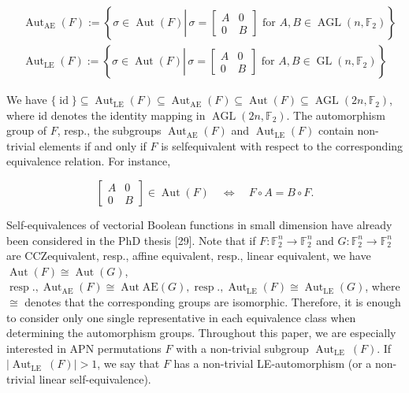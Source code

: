 \documentclass[10pt]{article}
\begin{document}
$$
\begin{aligned}
& \operatorname{Aut}_{\mathrm{AE}}(F):=\left\{\sigma \in \operatorname{Aut}(F) \left\lvert\, \sigma=\left[\begin{array}{cc}
A & 0 \\
0 & B
\end{array}\right]\right. \text { for } A, B \in \operatorname{AGL}\left(n, \mathbb{F}_{2}\right)\right\} \\
& \operatorname{Aut}_{\mathrm{LE}}(F):=\left\{\sigma \in \operatorname{Aut}(F) \left\lvert\, \sigma=\left[\begin{array}{cc}
A & 0 \\
0 & B
\end{array}\right]\right. \text { for } A, B \in \operatorname{GL}\left(n, \mathbb{F}_{2}\right)\right\}
\end{aligned}
$$

We have $\{\operatorname{id}\} \subseteq \operatorname{Aut}_{\mathrm{LE}}(F) \subseteq \operatorname{Aut}_{\mathrm{AE}}(F) \subseteq \operatorname{Aut}(F) \subseteq \operatorname{AGL}\left(2 n, \mathbb{F}_{2}\right)$, where id denotes the identity mapping in $\operatorname{AGL}\left(2 n, \mathbb{F}_{2}\right)$. The automorphism group of $F$, resp., the subgroups $\operatorname{Aut}_{\mathrm{AE}}(F)$ and $\operatorname{Aut}_{\mathrm{LE}}(F)$ contain non-trivial elements if and only if $F$ is selfequivalent with respect to the corresponding equivalence relation. For instance,

$$
\left[\begin{array}{cc}
A & 0 \\
0 & B
\end{array}\right] \in \operatorname{Aut}(F) \quad \Leftrightarrow \quad F \circ A=B \circ F .
$$

Self-equivalences of vectorial Boolean functions in small dimension have already been considered in the PhD thesis [29]. Note that if $F: \mathbb{F}_{2}^{n} \rightarrow \mathbb{F}_{2}^{n}$ and $G: \mathbb{F}_{2}^{n} \rightarrow \mathbb{F}_{2}^{n}$ are CCZequivalent, resp., affine equivalent, resp., linear equivalent, we have $\operatorname{Aut}(F) \cong \operatorname{Aut}(G)$, $\operatorname{resp} ., \operatorname{Aut}_{\mathrm{AE}}(F) \cong \operatorname{Aut} \mathrm{AE}(G), \operatorname{resp} ., \operatorname{Aut}_{\mathrm{LE}}(F) \cong \operatorname{Aut}_{\mathrm{LE}}(G)$, where $\cong$ denotes that the corresponding groups are isomorphic. Therefore, it is enough to consider only one single representative in each equivalence class when determining the automorphism groups. Throughout this paper, we are especially interested in APN permutations $F$ with a non-trivial subgroup $\operatorname{Aut}_{\text {LE }}(F)$. If $\left|\operatorname{Aut}_{\text {LE }}(F)\right|>1$, we say that $F$ has a non-trivial LE-automorphism (or a non-trivial linear self-equivalence).
\end{document}
